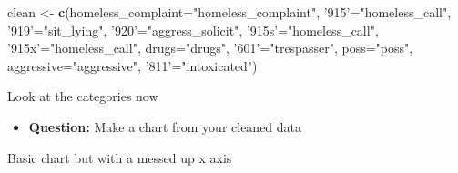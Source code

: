 \documentclass[]{book}
\newenvironment{Shaded}{\begin{snugshade}}{\end{snugshade}}
\newcommand{\DataTypeTok}[1]{\textcolor[rgb]{0.13,0.29,0.53}{#1}}
\newcommand{\KeywordTok}[1]{\textcolor[rgb]{0.13,0.29,0.53}{\textbf{#1}}}
\newcommand{\NormalTok}[1]{#1}
\newcommand{\OperatorTok}[1]{\textcolor[rgb]{0.81,0.36,0.00}{\textbf{#1}}}
\newcommand{\StringTok}[1]{\textcolor[rgb]{0.31,0.60,0.02}{#1}}
\providecommand{\tightlist}{%
  \setlength{\itemsep}{0pt}\setlength{\parskip}{0pt}}
\begin{document}
\begin{Shaded}
\begin{Highlighting}[]
\NormalTok{clean <-}\StringTok{ }\KeywordTok{c}\NormalTok{(}\DataTypeTok{homeless_complaint=}\StringTok{"homeless_complaint"}\NormalTok{, }\StringTok{'915'}\NormalTok{=}\StringTok{"homeless_call"}\NormalTok{, }\StringTok{'919'}\NormalTok{=}\StringTok{"sit_lying"}\NormalTok{, }\StringTok{'920'}\NormalTok{=}\StringTok{"aggress_solicit"}\NormalTok{, }\StringTok{'915s'}\NormalTok{=}\StringTok{"homeless_call"}\NormalTok{, }\StringTok{'915x'}\NormalTok{=}\StringTok{"homeless_call"}\NormalTok{, }\DataTypeTok{drugs=}\StringTok{"drugs"}\NormalTok{, }\StringTok{'601'}\NormalTok{=}\StringTok{"trespasser"}\NormalTok{,}
           \DataTypeTok{poss=}\StringTok{"poss"}\NormalTok{, }\DataTypeTok{aggressive=}\StringTok{"aggressive"}\NormalTok{, }\StringTok{'811'}\NormalTok{=}\StringTok{"intoxicated"}\NormalTok{)}
\end{Highlighting}
\end{Shaded}

\begin{Shaded}
\end{Shaded}

Look at the categories now

\begin{Shaded}
\end{Shaded}

\begin{itemize}
\tightlist
\item
  \textbf{Question:} Make a chart from your cleaned data
\end{itemize}

Basic chart but with a messed up x axis
\end{document}
